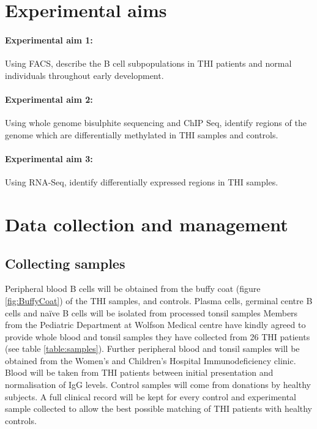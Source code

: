 \documentclass[12pt]{article}
\newcommand{\naive}{na\"{i}ve }
\begin{document}
	\section{Experimental aims}
		
		\paragraph{Experimental aim 1:} Using FACS, describe the B cell subpopulations in THI patients and normal individuals throughout early development.
		
		
		\paragraph{Experimental aim 2:} Using whole genome bisulphite sequencing and ChIP Seq, identify regions of the genome which are differentially methylated in THI samples and controls.
		
		\paragraph{Experimental aim 3:} Using RNA-Seq, identify differentially expressed regions in THI samples.

	\section{Data collection and management}
	
		\subsection{Collecting samples}
			
			Peripheral blood B cells will be obtained from the buffy coat (figure \ref{fig:BuffyCoat}) of the THI samples, and controls. 
			Plasma cells, germinal centre B cells and \naive B cells will be isolated from processed tonsil samples
			Members from the Pediatric Department at Wolfson Medical centre have kindly agreed to provide whole blood and tonsil samples they have collected from 26 THI patients (see table \ref{table:samples}).
			Further peripheral blood and tonsil samples will be obtained from the Women's and Children's Hospital Immunodeficiency clinic. 
			Blood will be taken from THI patients between initial presentation and normalisation of IgG levels.
			Control samples will come from donations by healthy subjects. 
			A full clinical record will be kept for every control and experimental sample collected to allow the best possible matching of THI patients with healthy controls. 
		
\end{document}
